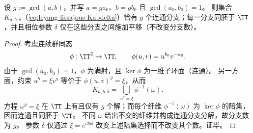 \begin{proposition}[扭曲约束的连通分支数]\label{prop:leyang-lissajous-K-components}
设 \(g:=\gcd(a,b)\)，并写 \(a=ga_0\)、\(b=gb_0\) 且 \(\gcd(a_0,b_0)=1\)。
则集合 \(K_{a,b,\delta}\)（\eqref{eq:leyang-lissajous-Kabdelta}）恰有 \(g\) 个连通分支；每一分支同胚于 \(\TT\)，并且相位参数 \(\delta\) 仅在这些分支之间施加平移（不改变分支数）。
\end{proposition}
\begin{proof}
考虑连续群同态
\[
\phi:\TT^2\to\TT,\qquad \phi(u,v)=u^{b_0}v^{-a_0}.
\]
由于 \(\gcd(a_0,b_0)=1\)，\(\phi\) 为满射，且 \(\ker\phi\) 为一维子环面（连通）。
另一方面，约束 \(u^b=\xi v^a\) 等价于 \(\phi(u,v)^g=\xi\)，从而
\[
K_{a,b,\delta}=\bigcup_{\omega^g=\xi}\phi^{-1}(\omega).
\]
方程 \(\omega^g=\xi\) 在 \(\TT\) 上有且仅有 \(g\) 个解；而每个纤维 \(\phi^{-1}(\omega)\) 为 \(\ker\phi\) 的陪集，因而连通且同胚于 \(\TT\)。
不同 \(\omega\) 给出不交的纤维并构成连通分支分解，故分支数为 \(g\)。
参数 \(\delta\) 仅通过 \(\xi=e^{\mathrm{i}2b\delta}\) 改变上述陪集选择而不改变其个数。证毕。
\end{proof}

